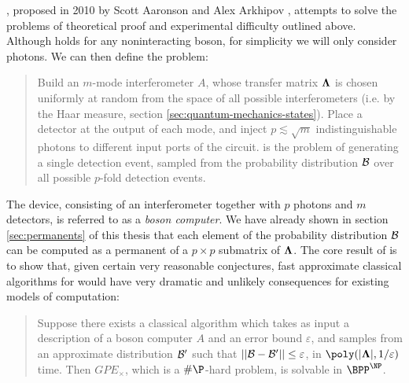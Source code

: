 \newcommand{\gpe}{GPE_\times}
\bosonsampling, proposed in 2010 by Scott Aaronson and Alex Arkhipov \cite{Aaronson2010}, attempts to solve the problems of theoretical proof and experimental difficulty outlined above. 
Although \bosonsampling holds for any noninteracting boson, for simplicity we will only consider photons. We can then define the problem:
\begin{quote}
Build an $m$-mode interferometer $A$, whose transfer matrix  $\mathbf{\Lambda}$ is chosen uniformly at random from the space of all possible interferometers (i.e. by the Haar measure, section \ref{sec:quantum-mechanics-states}).  Place a detector at the output of each mode, and inject $p\lesssim \sqrt{m}$ indistinguishable photons to different input ports of the circuit. \bosonsampling is the problem of generating a single detection event, sampled from the probability distribution $\mathcal{B}$ over all possible $p$-fold detection events.
\end{quote}
The device, consisting of an interferometer together with $p$ photons and $m$ detectors, is referred to as a \emph{boson computer}. We have already shown in section \ref{sec:permanents} of this thesis that each element of the probability distribution $\mathcal{B}$ can be computed as a permanent of a $p\times p$ submatrix of $\mathbf{\Lambda}$.
The core result of \cite{Aaronson2010} is to show that, given certain very reasonable conjectures, fast approximate classical algorithms for \bosonsampling would have very dramatic and unlikely consequences for existing models of computation:
\begin{quote}
Suppose there exists a classical algorithm which takes as input a description of a boson computer $A$ and an error bound $\varepsilon$, and samples from an approximate distribution $\mathcal{B}'$ such that $||\mathcal{B} - \mathcal{B}'|| \le \varepsilon$, in $\poly(|\transfer|, 1/\varepsilon)$ time. Then 
$\gpe$, which is a $\#\P$-hard problem, is solvable in $\BPP^{\NP}$.  \cite{Aaronson2010}
\end{quote}
